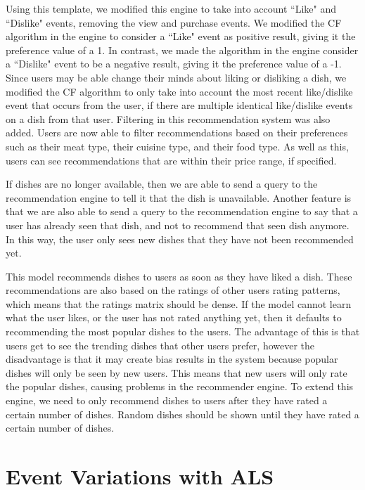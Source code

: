 Using this template, we modified this engine to take into account ``Like" and ``Dislike" events, removing the view and purchase events. We modified the CF algorithm in the engine to consider a ``Like" event as positive result, giving it the preference value of a 1. In contrast, we made the algorithm in the engine consider a ``Dislike" event to be a negative result, giving it the preference value of a -1. Since users may be able change their minds about liking or disliking a dish, we modified the CF algorithm to only take into account the most recent like/dislike event that occurs from the user, if there are multiple identical like/dislike events on a dish from that user. Filtering in this recommendation system was also added. Users are now able to filter recommendations based on their preferences such as their meat type, their cuisine type, and their food type. As well as this, users can see recommendations that are within their price range, if specified. 

If dishes are no longer available, then we are able to send a query to the recommendation engine to tell it that the dish is unavailable. Another feature is that we are also able to send a query to the recommendation engine to say that a user has already seen that dish, and not to recommend that seen dish anymore. In this way, the user only sees new dishes that they have not been recommended yet.

This model recommends dishes to users as soon as they have liked a dish. These recommendations are also based on the ratings of other users rating patterns, which means that the ratings matrix should be dense. If the model cannot learn what the user likes, or the user has not rated anything yet, then it defaults to recommending the most popular dishes to the users. The advantage of this is that users get to see the trending dishes that other users prefer, however the disadvantage is that it may create bias results in the system because popular dishes will only be seen by new users. This means that new users will only rate the popular dishes, causing problems in the recommender engine. To extend this engine, we need to only recommend dishes to users after they have rated a certain number of dishes. Random dishes should be shown until they have rated a certain number of dishes. 


\section{Event Variations with ALS} \label{algorithms}

